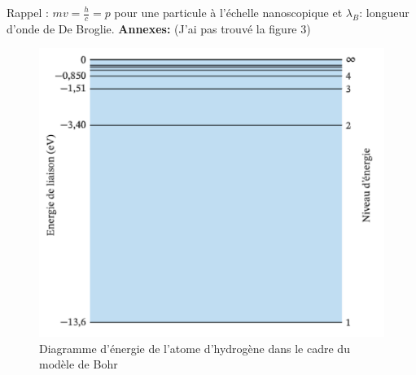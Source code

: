 \documentclass{article}
\begin{document}
Rappel : $mv = \frac{h}{c} = p$ pour une particule à l'échelle nanoscopique et $\lambda_{B}$: longueur d'onde de De Broglie.
\newpage
\noindent\textbf{Annexes:}\newline
(J'ai pas trouvé la figure 3)
\begin{figure}[h]
    \centering
    \includegraphics[scale=0.5]{figure2.png}
    \caption{Diagramme d'énergie de l'atome d'hydrogène dans le cadre du modèle de Bohr}
\end{figure}
\end{document}
